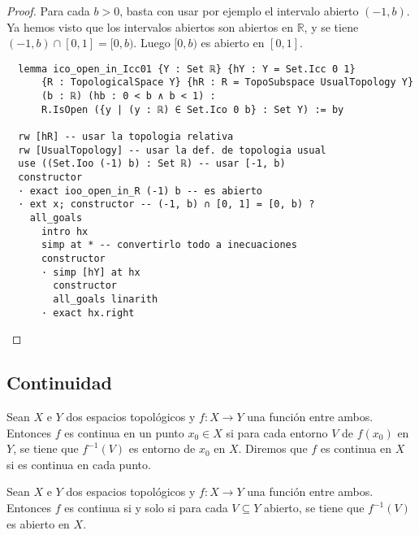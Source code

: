 \begin{proof}
  Para cada $b > 0$, basta con usar por ejemplo el intervalo abierto $(-1, b)$. Ya hemos visto que los intervalos abiertos son abiertos en $\mathbb{R}$, y se tiene $(-1, b) \cap [0, 1] = [0, b)$. Luego $[0, b)$ es abierto en $[0, 1]$.

  \begin{lstlisting}
  lemma ico_open_in_Icc01 {Y : Set ℝ} {hY : Y = Set.Icc 0 1}
      {R : TopologicalSpace Y} {hR : R = TopoSubspace UsualTopology Y}
      (b : ℝ) (hb : 0 < b ∧ b < 1) :
      R.IsOpen ({y | (y : ℝ) ∈ Set.Ico 0 b} : Set Y) := by

  rw [hR] -- usar la topologia relativa
  rw [UsualTopology] -- usar la def. de topologia usual
  use ((Set.Ioo (-1) b) : Set ℝ) -- usar [-1, b)
  constructor
  · exact ioo_open_in_R (-1) b -- es abierto
  · ext x; constructor -- (-1, b) ∩ [0, 1] = [0, b) ?
    all_goals
      intro hx
      simp at * -- convertirlo todo a inecuaciones
      constructor
      · simp [hY] at hx
        constructor
        all_goals linarith
      · exact hx.right \end{lstlisting}
\end{proof}


\subsection{Continuidad}

\begin{definition}
  Sean $X$ e $Y$ dos espacios topológicos y $f : X \to Y$ una función entre ambos. Entonces $f$ es \textnormal{continua} en un punto $x_0 \in X$ si para cada entorno $V$ de $f(x_0)$ en $Y$, se tiene que $f^{-1}(V)$ es entorno de $x_0$ en $X$. Diremos que $f$ es \textnormal{continua} en $X$ si es continua en cada punto.
\end{definition}

\begin{proposition}
  Sean $X$ e $Y$ dos espacios topológicos y $f : X \to Y$ una función entre ambos. Entonces $f$ es continua si y solo si para cada $V \subseteq Y$ abierto, se tiene que $f^{-1}(V)$ es abierto en $X$.
\end{proposition}

